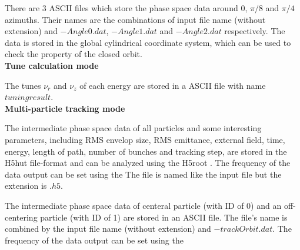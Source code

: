 There are 3 ASCII files which store the phase space data around $0$, $\pi/8$ and $\pi/4$ azimuths.
Their names are the combinations of input file name (without extension) and $-Angle0.dat$, $-Angle1.dat$ and $-Angle2.dat$ respectively.
The data is stored in the global cylindrical coordinate system, which can be used to check the property of the closed orbit.\\

{\bfseries Tune calculation mode}

 The tunes $\nu_r$ and $\nu_z$ of each energy are stored in a ASCII file with name $tuningresult$.\\

{\bfseries Multi-particle tracking mode}

The intermediate phase space data of all particles and some interesting parameters,
including RMS envelop size, RMS emittance, external field, time, energy, length of path, number of bunches and
tracking step, are stored in the H5hut file-format \cite{bib:howison2010} and can be analyzed
using the H5root \cite{bib:schietinger}.
The frequency of the data output can be set using the %
The file is named like the input file but the extension is $.h5$.

The intermediate phase space data of centeral particle (with ID of 0) and an off-centering particle (with ID of 1)
are stored in an ASCII file. The file's name is combined by the input file name (without extension) and $-trackOrbit.dat$.
The frequency of the data output can be set using the  %


